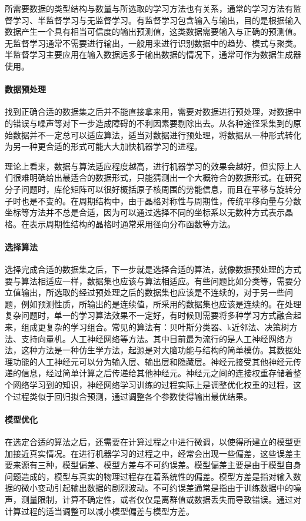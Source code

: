 所需要数据的类型结构与数量与所选取的学习方法也有关系，通常的学习方法有监督学习、半监督学习与无监督学习。有监督学习包含输入与输出，目的是根据输入数据产生一个具有相当可信度的输出预测值，这类数据需要输入与正确的预测值。无监督学习通常不需要进行输出，一般用来进行识别数据中的趋势、模式与聚类。半监督学习主要应用在输入数据远多于输出数据的情况下，通常可作为数据生成器使用。

\paragraph{数据预处理}
找到正确合适的数据集之后并不能直接拿来用，需要对数据进行预处理，对数据中的错误与噪声等对下一步造成障碍的不利因素要剔除出去。从各种途径采集到的原始数据并不一定总可以适应算法，适当对数据进行预处理，将数据从一种形式转化为另一种更合适的形式可能大大加快机器学习的进程。

理论上看来，数据与算法适应程度越高，进行机器学习的效果会越好，但实际上人们很难明确给出最适合的数据形式，只能猜测出一个大概符合的数据形式。在研究分子问题时，库伦矩阵可以很好概括原子核周围的势能信息，而且在平移与旋转分子时也是不变的。在周期结构中，由于晶格对称性与周期性，传统平移向量与分数坐标等方法并不总是合适，因为可以通过选择不同的坐标系以无数种方式表示晶格。在表示周期性结构的晶格时通常采用径向分布函数等方法。

\paragraph{选择算法}

选择完成合适的数据集之后，下一步就是选择合适的算法，就像数据预处理的方式要与算法相适应一样，数据集也应该与算法相适应。有些问题比如分类等，需要分立值输出，所选取的经过预处理之后的数据集也应该是不连续的，对于另一些问题，例如预测性质，所输出的是连续值，所采用的数据集也应该是连续的。在处理复杂问题时，单一的学习算法效果不一定好，有时候则需要将多种学习方式融合起来，组成更复杂的学习组合。常见的算法有：贝叶斯分类器、k近邻法、决策树方法、支持向量机。人工神经网络等方法。其中目前最为流行的是人工神经网络方法，这种方法是一种仿生学方法，起源是对大脑功能与结构的简单模仿。其数据处理功能的人工神经元可以分为输入层、输出层和隐藏层。神经元接受其他神经元传递的信息，经过简单计算之后传递给其他神经元。神经元之间的连接权重存储着整个网络学习到的知识，神经网络学习训练的过程实际上是调整优化权重的过程，这个过程类似于回归拟合预测，通过调整各个参数使得输出最优结果。

\paragraph{模型优化}
在选定合适的算法之后，还需要在计算过程之中进行微调，以使得所建立的模型更加接近真实情况。在进行机器学习的过程之中，经常会出现一些偏差，这些误差主要来源有三种，模型偏差、模型方差与不可约误差。模型偏差主要是由于模型自身问题造成的，模型与真实的物理过程存在着系统性的偏差。模型方差是指对输入数据的微小变动引起输出数据的剧烈波动。不可约误差通常是指由于训练数据中的噪声，测量限制，计算不确定性，或者仅仅是离群值或数据丢失而导致错误。通过对计算过程的适当调整可以减小模型偏差与模型方差。


